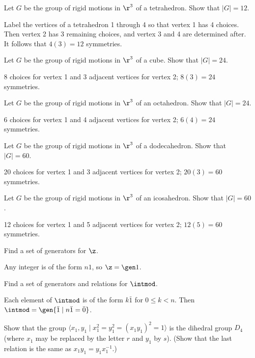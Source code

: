 \begin{problems}[resume]
    \item \label{ex1.2.9} Let $G$ be the group of rigid motions in $\r^3$ of a tetrahedron. Show that $|G| = 12$.
    \begin{sol}
        Label the vertices of a tetrahedron 1 through 4 so that vertex 1 has 4 choices. Then vertex 2 has 3 remaining choices, and vertex 3 and 4 are determined after. It follows that $4(3) = 12$ symmetries.
    \end{sol}
    \item Let $G$ be the group of rigid motions in $\r^3$ of a cube. Show that $|G| = 24$.
    \label{ex1.2.10}
    \begin{sol}
        8 choices for vertex 1 and 3 adjacent vertices for vertex 2; $8(3) = 24$ symmetries.
    \end{sol}
    \item Let $G$ be the group of rigid motions in $\r^3$ of an octahedron. Show that $|G| = 24$.
    \label{ex1.2.11}
    \begin{sol}
        6 choices for vertex 1 and 4 adjacent vertices for vertex 2; $6(4) = 24$ symmetries.
    \end{sol}
    \item Let $G$ be the group of rigid motions in $\r^3$ of a dodecahedron. Show that $|G| = 60$.
    \begin{sol}
        20 choices for vertex 1 and 3 adjacent vertices for vertex 2; $20(3) = 60$ symmetries.
    \end{sol}
    \item Let $G$ be the group of rigid motions in $\r^3$ of an icosahedron. Show that $|G| = 60$.
    \begin{sol}
        12 choices for vertex 1 and 5 adjacent vertices for vertex 2; $12(5) = 60$ symmetries.
    \end{sol}
    \item Find a set of generators for $\z$.
    \begin{sol}
        Any integer is of the form $n1$, so $\z = \gen 1$.
    \end{sol}
    \item Find a set of generators and relations for $\intmod$.
    \begin{sol}
        Each element of $\intmod$ is of the form $k\bar 1$ for $0 \leq k < n$. Then $\intmod = \gen{\bar 1 \mid n\bar 1 = \bar 0}$.
    \end{sol}
    \item Show that the group $\langle x_1, y_1 \mid x_1^2 = y_1^2 = (x_1 y_1)^2 = 1 \rangle$ is the dihedral group $D_4$ (where $x_1$ may be replaced by the letter $r$ and $y_1$ by $s$). (Show that the last relation is the same as $x_1 y_1 = y_1 x_1^{-1}$.)

\end{problems}
